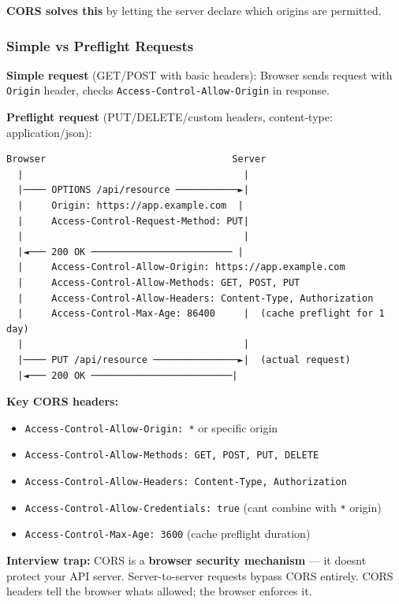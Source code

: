 \documentclass[11pt]{article}
\providecommand{\tightlist}{\setlength{\itemsep}{1pt}\setlength{\parskip}{0pt}}
\begin{document}
\textbf{CORS solves this} by letting the server declare which origins are permitted.

\subsubsection{Simple vs Preflight Requests}\label{simple-vs-preflight-requests}

\textbf{Simple request} (GET/POST with basic headers): Browser sends request with \texttt{Origin} header, checks \texttt{Access-Control-Allow-Origin} in response.

\textbf{Preflight request} (PUT/DELETE/custom headers, content-type: application/json):

\setcodelang{}

\begin{verbatim}
Browser                                 Server
  |                                       |
  |──── OPTIONS /api/resource ───────────►|
  |     Origin: https://app.example.com  |
  |     Access-Control-Request-Method: PUT|
  |                                       |
  |◄─── 200 OK ───────────────────────── |
  |     Access-Control-Allow-Origin: https://app.example.com
  |     Access-Control-Allow-Methods: GET, POST, PUT
  |     Access-Control-Allow-Headers: Content-Type, Authorization
  |     Access-Control-Max-Age: 86400     |  (cache preflight for 1 day)
  |                                       |
  |──── PUT /api/resource ───────────────►|  (actual request)
  |◄─── 200 OK ─────────────────────────|
\end{verbatim}

\textbf{Key CORS headers:}

\begin{itemize}
\tightlist
\item
  \texttt{Access-Control-Allow-Origin:\ *} or specific origin
\item
  \texttt{Access-Control-Allow-Methods:\ GET,\ POST,\ PUT,\ DELETE}
\item
  \texttt{Access-Control-Allow-Headers:\ Content-Type,\ Authorization}
\item
  \texttt{Access-Control-Allow-Credentials:\ true} (can\textquotesingle t combine with \texttt{*} origin)
\item
  \texttt{Access-Control-Max-Age:\ 3600} (cache preflight duration)
\end{itemize}

\textbf{Interview trap:} CORS is a \textbf{browser security mechanism} --- it doesn\textquotesingle t protect your API server. Server-to-server requests bypass CORS entirely. CORS headers tell the browser what\textquotesingle s allowed; the browser enforces it.
\end{document}
